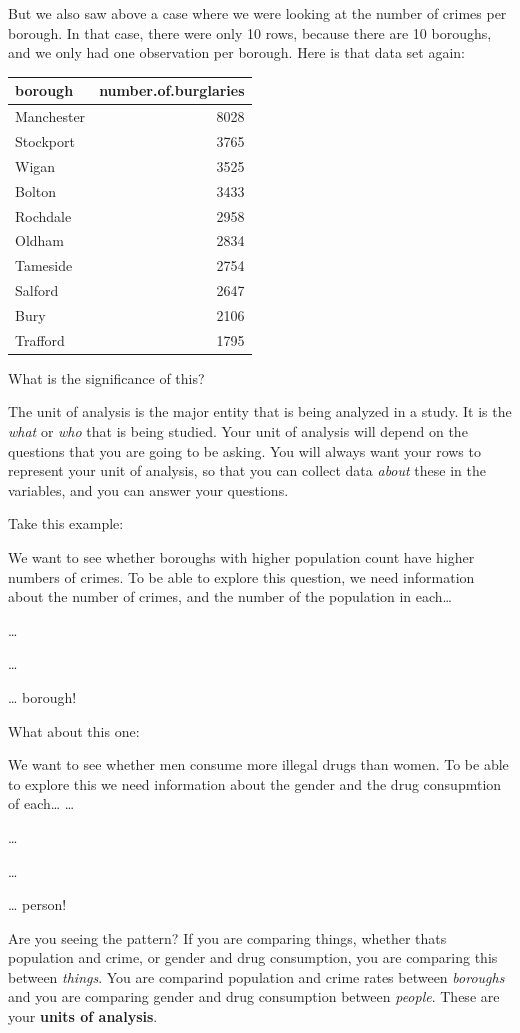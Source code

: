\documentclass[]{book}
\theoremstyle{definition}
\theoremstyle{definition}
\theoremstyle{definition}
\theoremstyle{remark}
\begin{document}
But we also saw above a case where we were looking at the number of
crimes per borough. In that case, there were only 10 rows, because there
are 10 boroughs, and we only had one observation per borough. Here is
that data set again:

\begin{tabular}{l|r}
\hline
borough & number.of.burglaries\\
\hline
Manchester & 8028\\
\hline
Stockport & 3765\\
\hline
Wigan & 3525\\
\hline
Bolton & 3433\\
\hline
Rochdale & 2958\\
\hline
Oldham & 2834\\
\hline
Tameside & 2754\\
\hline
Salford & 2647\\
\hline
Bury & 2106\\
\hline
Trafford & 1795\\
\hline
\end{tabular}

What is the significance of this?

The unit of analysis is the major entity that is being analyzed in a
study. It is the \emph{what} or \emph{who} that is being studied. Your
unit of analysis will depend on the questions that you are going to be
asking. You will always want your rows to represent your unit of
analysis, so that you can collect data \emph{about} these in the
variables, and you can answer your questions.

Take this example:

We want to see whether boroughs with higher population count have higher
numbers of crimes. To be able to explore this question, we need
information about the number of crimes, and the number of the population
in each\ldots{}

\ldots{}

\ldots{}

\ldots{} borough!

What about this one:

We want to see whether men consume more illegal drugs than women. To be
able to explore this we need information about the gender and the drug
consupmtion of each\ldots{} \ldots{}

\ldots{}

\ldots{}

\ldots{} person!

Are you seeing the pattern? If you are comparing things, whether thats
population and crime, or gender and drug consumption, you are comparing
this between \emph{things}. You are comparind population and crime rates
between \emph{boroughs} and you are comparing gender and drug
consumption between \emph{people}. These are your \textbf{units of
analysis}.
\end{document}
